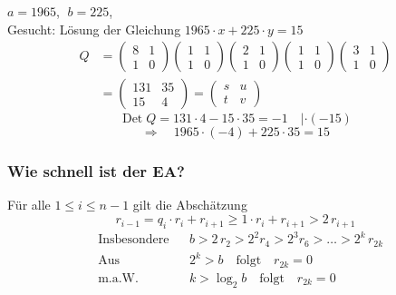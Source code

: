 \begin{beispiel}[Fortsetzung]
$a = 1965$, $\;b = 225$,\\
Gesucht: Lösung der Gleichung $1965 \cdot x + 225 \cdot y = 15$
\begin{align*}
Q &= \begin{pmatrix} 8 & 1 \\ 1 & 0 \end{pmatrix} \begin{pmatrix} 1 & 1 \\ 1 & 0 \end{pmatrix} \begin{pmatrix} 2 & 1 \\ 1 & 0 \end{pmatrix} \begin{pmatrix} 1 & 1 \\ 1 & 0 \end{pmatrix} \begin{pmatrix} 3 & 1 \\ 1 & 0 \end{pmatrix} \\
&= \begin{pmatrix} 131 & 35 \\ 15 & 4 \end{pmatrix} = \begin{pmatrix} s & u \\ t & v \end{pmatrix}
\end{align*}
\[ \operatorname{Det} Q = 131 \cdot 4 - 15 \cdot 35 = -1 \quad | \cdot (-15) \]
\[ \Rightarrow \quad 1965 \cdot (-4) + 225 \cdot 35 = 15 \]
\end{beispiel}

\subsubsection*{Wie schnell ist der EA?}

Für alle $1 \leq i \leq n - 1$ gilt die Abschätzung
\[ r_{i-1} = q_i \cdot r_i + r_{i+1} \geq 1 \cdot r_i + r_{i+1} > 2\, r_{i+1} \]
\begin{align*}
&\text{Insbesondere} && b > 2\, r_2 > 2^2 r_4 > 2^3 r_6 > \ldots > 2^k\, r_{2k} \\
&\text{Aus} && 2^k > b \quad \text{folgt} \quad r_{2k} = 0 \\
&\text{m.a.W.} && k > \log_2 b \quad \text{folgt} \quad r_{2k} = 0
\end{align*}

